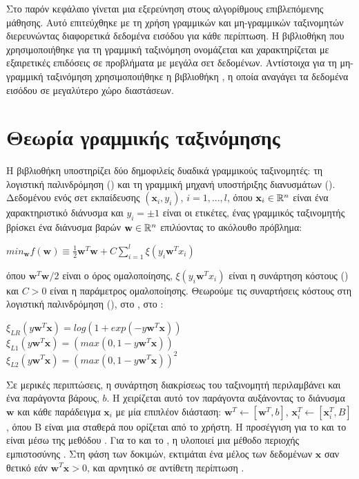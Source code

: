 Στο παρόν κεφάλαιο γίνεται μια εξερεύνηση στους αλγορίθμους επιβλεπόμενης μάθησης. Αυτό επιτεύχθηκε με τη χρήση γραμμικών και μη-γραμμικών ταξινομητών διερευνώντας διαφορετικά δεδομένα εισόδου για κάθε περίπτωση. Η βιβλιοθήκη που χρησιμοποιήθηκε για τη γραμμική ταξινόμηση ονομάζεται  και χαρακτηρίζεται με εξαιρετικές επιδόσεις σε προβλήματα με μεγάλα σετ δεδομένων. Αντίστοιχα για τη μη-γραμμική ταξινόμηση χρησιμοποιήθηκε η βιβλιοθήκη , η οποία αναγάγει τα δεδομένα εισόδου σε μεγαλύτερο χώρο διαστάσεων.
\section{Θεωρία γραμμικής ταξινόμησης}
Η βιβλιοθήκη  υποστηρίζει δύο δημοφιλείς δυαδικά γραμμικούς ταξινομητές: τη λογιστική παλινδρόμηση () και τη γραμμική μηχανή υποστήριξης διανυσμάτων (). Δεδομένου ενός σετ εκπαίδευσης $(\mathbf{x}_i, y_i)$, $i=1,...,l$, όπου $\mathbf{x}_i\in\mathbb{R}^n$ είναι ένα χαρακτηριστικό διάνυσμα και $y_i=\pm1$ είναι οι ετικέτες, ένας γραμμικός ταξινομητής βρίσκει ένα διάνυσμα βαρών $\mathbf{w}\in\mathbb{R}^n$ επιλύοντας το ακόλουθο πρόβλημα:
\begin{center}
$min_{\mathbf{w}}f(\mathbf{w})\equiv\frac{1}{2}\mathbf{w}^T\mathbf{w}+C\sum_{i=1}^{l}\xi(y_i\mathbf{w}^T x_i)$
\end{center}
όπου $\mathbf{w}^T\mathbf{w}/2$ είναι ο όρος ομαλοποίησης, $\xi(y_i\mathbf{w}^T x_i)$ είναι η συνάρτηση κόστους () και $C>0$ είναι η παράμετρος ομαλοποίησης. Θεωρούμε τις συναρτήσεις κόστους στη λογιστική παλινδρόμηση (), στο  , στο :
\begin{center}
$\xi_{LR}(y\mathbf{w}^T\mathbf{x})=log(1 + exp(-y\mathbf{w}^T\mathbf{x}))$\\
$\xi_{L1}(y\mathbf{w}^T\mathbf{x})=(max(0, 1 - y\mathbf{w}^T\mathbf{x}))$\\
$\xi_{L2}(y\mathbf{w}^T\mathbf{x})=(max(0, 1 - y\mathbf{w}^T\mathbf{x}))^2$
\end{center}
Σε μερικές περιπτώσεις, η συνάρτηση διακρίσεως του ταξινομητή περιλαμβάνει και ένα παράγοντα βάρους, $b$. Η  χειρίζεται αυτό τον παράγοντα αυξάνοντας το διάνυσμα $\mathbf{w}$ και κάθε παράδειγμα $\mathbf{x}_i$ με μία επιπλέον διάσταση: $\mathbf{w}^T \leftarrow [\mathbf{w}^T, b]$, $\mathbf{x}_i^T \leftarrow [\mathbf{x}_i^T, B]$, όπου B είναι μια σταθερά που ορίζεται από το χρήστη. Η προσέγγιση για το  και το   είναι μέσω της μεθόδου . Για το  και το , η  υλοποιεί μια μέθοδο περιοχής εμπιστοσύνης . Στη φάση των δοκιμών, εκτιμάται ένα μέλος των δεδομένων $\mathbf{x}$ σαν θετικό εάν $\mathbf{w}^T\mathbf{x}>0$, και αρνητικό σε αντίθετη περίπτωση\cite{liblinearguide} \cite{liblinearreport}.\par
